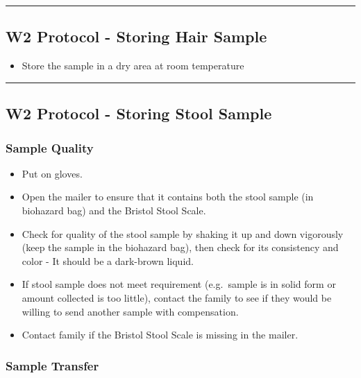 \documentclass[
]{book}
\providecommand{\tightlist}{%
  \setlength{\itemsep}{0pt}\setlength{\parskip}{0pt}}
\begin{document}
\begin{center}\rule{0.5\linewidth}{0.5pt}\end{center}

\hypertarget{w2-protocol---storing-hair-sample}{%
\subsection{W2 Protocol - Storing Hair Sample}\label{w2-protocol---storing-hair-sample}}

\begin{itemize}
\tightlist
\item
  Store the sample in a dry area at room temperature
\end{itemize}

\begin{center}\rule{0.5\linewidth}{0.5pt}\end{center}

\hypertarget{w2-protocol---storing-stool-sample}{%
\subsection{W2 Protocol - Storing Stool Sample}\label{w2-protocol---storing-stool-sample}}

\hypertarget{sample-quality-2}{%
\subsubsection{Sample Quality}\label{sample-quality-2}}

\begin{itemize}
\tightlist
\item
  Put on gloves.
\item
  Open the mailer to ensure that it contains both the stool sample (in biohazard bag) and the Bristol Stool Scale.
\item
  Check for quality of the stool sample by shaking it up and down vigorously (keep the sample in the biohazard bag), then check for its consistency and color - It should be a dark-brown liquid.
\item
  If stool sample does not meet requirement (e.g.~sample is in solid form or amount collected is too little), contact the family to see if they would be willing to send another sample with compensation.
\item
  Contact family if the Bristol Stool Scale is missing in the mailer.
\end{itemize}

\hypertarget{sample-transfer-3}{%
\subsubsection{Sample Transfer}\label{sample-transfer-3}}
\end{document}
